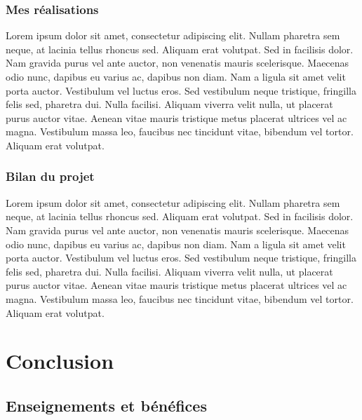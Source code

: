 \documentclass[a4paper,11pt,twoside]{report}
\begin{document}
    \subsection*{Mes réalisations}
    Lorem ipsum dolor sit amet, consectetur adipiscing elit. Nullam pharetra sem neque, at lacinia tellus rhoncus sed. Aliquam erat volutpat. Sed in facilisis dolor. Nam gravida purus vel ante auctor, non venenatis mauris scelerisque. Maecenas odio nunc, dapibus eu varius ac, dapibus non diam. Nam a ligula sit amet velit porta auctor. Vestibulum vel luctus eros. Sed vestibulum neque tristique, fringilla felis sed, pharetra dui. Nulla facilisi. Aliquam viverra velit nulla, ut placerat purus auctor vitae. Aenean vitae mauris tristique metus placerat ultrices vel ac magna. Vestibulum massa leo, faucibus nec tincidunt vitae, bibendum vel tortor. Aliquam erat volutpat.
    \subsection*{Bilan du projet}
    Lorem ipsum dolor sit amet, consectetur adipiscing elit. Nullam pharetra sem neque, at lacinia tellus rhoncus sed. Aliquam erat volutpat. Sed in facilisis dolor. Nam gravida purus vel ante auctor, non venenatis mauris scelerisque. Maecenas odio nunc, dapibus eu varius ac, dapibus non diam. Nam a ligula sit amet velit porta auctor. Vestibulum vel luctus eros. Sed vestibulum neque tristique, fringilla felis sed, pharetra dui. Nulla facilisi. Aliquam viverra velit nulla, ut placerat purus auctor vitae. Aenean vitae mauris tristique metus placerat ultrices vel ac magna. Vestibulum massa leo, faucibus nec tincidunt vitae, bibendum vel tortor. Aliquam erat volutpat.


    
    
\chapter*{Conclusion}
  \section*{Enseignements et bénéfices}
\end{document}
